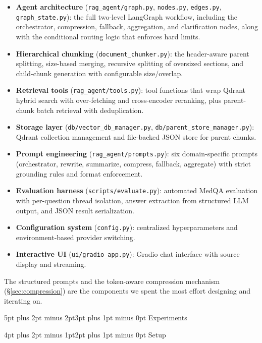 \documentclass[10pt,twocolumn,letterpaper]{article}
\makeatletter
\renewcommand\section{\@startsection{section}{1}{\z@}%
  {5pt plus 2pt minus 2pt}{3pt plus 1pt minus 0pt}%
  {\large\bfseries}}
\renewcommand\subsection{\@startsection{subsection}{2}{\z@}%
  {4pt plus 2pt minus 1pt}{2pt plus 1pt minus 0pt}%
  {\normalsize\bfseries}}
\makeatother
\begin{document}
\begin{itemize}[nosep,leftmargin=*]
\item \textbf{Agent architecture} (\texttt{rag\_agent/graph.py}, \texttt{nodes.py}, \texttt{edges.py}, \texttt{graph\_state.py}): the full two-level LangGraph workflow, including the orchestrator, compression, fallback, aggregation, and clarification nodes, along with the conditional routing logic that enforces hard limits.
\item \textbf{Hierarchical chunking} (\texttt{document\_chunker.py}): the header-aware parent splitting, size-based merging, recursive splitting of oversized sections, and child-chunk generation with configurable size/overlap.
\item \textbf{Retrieval tools} (\texttt{rag\_agent/tools.py}): tool functions that wrap Qdrant hybrid search with over-fetching and cross-encoder reranking, plus parent-chunk batch retrieval with deduplication.
\item \textbf{Storage layer} (\texttt{db/vector\_db\_manager.py}, \texttt{db/parent\_store\_manager.py}): Qdrant collection management and file-backed JSON store for parent chunks.
\item \textbf{Prompt engineering} (\texttt{rag\_agent/prompts.py}): six domain-specific prompts (orchestrator, rewrite, summarize, compress, fallback, aggregate) with strict grounding rules and format enforcement.
\item \textbf{Evaluation harness} (\texttt{scripts/evaluate.py}): automated MedQA evaluation with per-question thread isolation, answer extraction from structured LLM output, and JSON result serialization.
\item \textbf{Configuration system} (\texttt{config.py}): centralized hyperparameters and environment-based provider switching.
\item \textbf{Interactive UI} (\texttt{ui/gradio\_app.py}): Gradio chat interface with source display and streaming.
\end{itemize}

The structured prompts and the token-aware compression mechanism (\S\ref{sec:compression}) are the components we spent the most effort designing and iterating on.

\section{Experiments}

\subsection{Setup}
\end{document}
